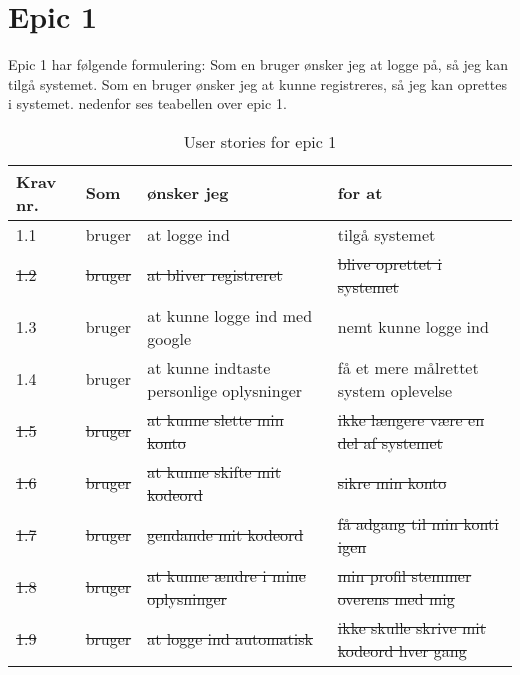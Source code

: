 \section{Epic 1}
Epic 1 har følgende formulering: 
Som en bruger ønsker jeg at logge på, så jeg kan tilgå systemet.
Som en bruger ønsker jeg at kunne registreres, så jeg kan oprettes i systemet.
nedenfor ses teabellen over epic 1.

\begin{table}[H]
    \centering
    \caption{User stories for epic 1}
    \label{tab:us-epic1}
    \begin{tabular}{p{1cm}|p{2cm}|p{6cm}|p{6cm}}
        \textbf{Krav nr.} & \textbf{Som} & \textbf{ønsker jeg}                      & \textbf{for at}                          \\
        \hline
        1.1               & bruger       & at logge ind                             & tilgå systemet                           \\
        \hline
		\sout{1.2}               & \sout{bruger}       & \sout{at bliver registreret}                    & \sout{blive oprettet i systemet}   \\
        \hline
        1.3               & bruger       & at kunne logge ind med google            & nemt kunne logge ind                     \\
        \hline
        1.4               & bruger       & at kunne indtaste personlige oplysninger & få et mere målrettet system oplevelse    \\
		\hline
     	\sout{1.5}        & \sout{bruger}       & \sout{at kunne slette min konto}  & \sout{ikke længere være en del af systemet}  \\ 
        \hline
		\sout{1.6}        & \sout{bruger}        & \sout{at kunne skifte mit kodeord}              & \sout{sikre min konto}           \\
        \hline
        \sout{1.7}        & \sout{bruger}        & \sout{gendande mit kodeord}                     & \sout{få adgang til min konti igen}             \\
        \hline
        \sout{1.8}        & \sout{bruger}        & \sout{at kunne ændre i mine oplysninger}        & \sout{min profil stemmer overens med mig}       \\
        \hline
        \sout{1.9}        & \sout{bruger}        & \sout{at logge ind automatisk}           & \sout{ikke skulle skrive mit kodeord hver gang} \\
    \end{tabular}
\end{table}

